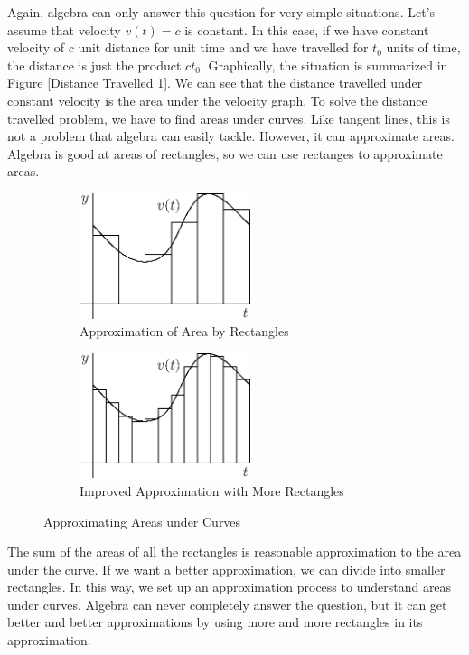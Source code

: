 \documentclass[fleqn]{report}
\begin{document}
Again, algebra can only answer this
question for very simple situations. Let's assume that
velocity $v(t) = c$ is constant. In this case, if we have
constant velocity of $c$ unit distance for unit time and we
have travelled for $t_0$ units of time, the distance is just the
product $ct_0$. Graphically, the situation is summarized in 
Figure \ref{Distance Travelled 1}. We can see that the distance
travelled under constant velocity is the area under the
velocity graph.  To solve the distance travelled problem, we
have to find areas under curves. Like tangent lines, this is
not a problem that algebra can easily tackle. However, it can
approximate areas. Algebra is good at areas of rectangles, so
we can use rectanges to approximate areas.

\begin{figure}[bt]
\centering
\begin{subfigure}{.5\textwidth}
 \centering
 \includegraphics[width=5cm]{figure16.eps}
 \caption{Approximation of Area by Rectangles}
\end{subfigure}%
\begin{subfigure}{.5\textwidth}
 \centering
 \includegraphics[width=5cm]{figure17.eps}
 \caption{Improved Approximation with More Rectangles}
\end{subfigure}
\caption{Approximating Areas under Curves}
\label{Approximating Areas under Curves 1}
\end{figure}

The sum of the areas of all the rectangles is reasonable
approximation to the area under the curve. If we want a
better approximation, we can divide into smaller rectangles.
In this way, we set up an approximation process to understand
areas under curves. Algebra can never completely answer the
question, but it can get better and better approximations by
using more and more rectangles in its approximation.
\end{document}
